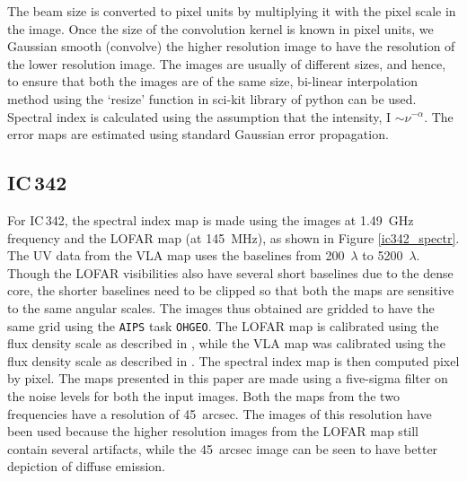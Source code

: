 \documentclass[../main/thesis_msc.tex]{subfiles}
\begin{document}
The beam size is converted to pixel units by multiplying it with the pixel scale in the image. Once the size of the convolution kernel is known in pixel units, we Gaussian smooth (convolve) the higher resolution image to have the resolution of the lower resolution image. The images are usually of different sizes, and hence, to ensure that both the images are of the same size, bi-linear interpolation method using the `resize' function in sci-kit library of python can be used. Spectral index is calculated using the assumption that the intensity, I $\sim \nu^{-\alpha}$. The error maps are estimated using standard Gaussian error propagation. 

\subsection{IC\,342}
For IC\,342, the spectral index map is made using the images at 1.49~GHz frequency \citep{2015A&A...578A..93B} and the LOFAR map (at 145~MHz), as shown in Figure \ref{ic342_spectr}. The UV data from the VLA map uses the baselines from 200~$\lambda$ to 5200~$\lambda$. Though the LOFAR visibilities also have several short baselines due to the dense core, the shorter baselines need to be clipped so that both the maps are sensitive to the same angular scales. The images thus obtained are gridded to have the same grid using the \verb|AIPS| task \verb|OHGEO|. The LOFAR map is calibrated using the flux density scale as described in \citet{2012MNRAS.423L..30S}, while the VLA map was calibrated using the flux density scale as described in \citet{2017ApJS..230....7P}. The spectral index map is then computed pixel by pixel. The maps presented in this paper are made using a five-sigma filter on the noise levels for both the input images. Both the maps from the two frequencies have a resolution of 45~arcsec. The images of this resolution have been used because the higher resolution images from the LOFAR map still contain several artifacts, while the 45~arcsec image can be seen to have better depiction of diffuse emission. \\
\end{document}
